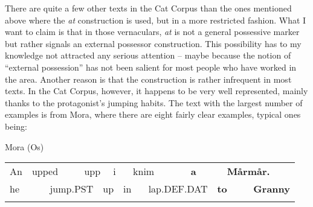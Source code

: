 \begin{styleBodytextC}
There are quite a few other texts in the Cat Corpus than the ones mentioned above where the \textit{at }construction is used, but in a more restricted fashion. What I want to claim is that in those vernaculars, \textit{at }is not a general possessive marker but rather signals an external possessor construction. This possibility has to my knowledge not attracted any serious attention – maybe because the notion of “external possession” has not been salient for most people who have worked in the area. Another reason is that the construction is rather infrequent in most texts. In the Cat Corpus, however, it happens to be very well represented, mainly thanks to the protagonist’s jumping habits. The text with the largest number of examples is from Mora, where there are eight fairly clear examples, typical ones being:

\end{styleBodytextC}


\begin{listWWNumileveli}
\item {}

\begin{styleExample}
\label{bkm:Ref137369958}Mora (Os)

\end{styleExample}

\end{listWWNumileveli}

\begin{listWWNumlxxxvileveli}
\item {}

\end{listWWNumlxxxvileveli}

\begin{tabular}{llllllllllllll}
\lsptoprule
An & \multicolumn{2}{l}{upped

} & \multicolumn{2}{l}{upp

} & \multicolumn{2}{l}{i

} & \multicolumn{2}{l}{knim

} & \multicolumn{2}{l}{{\bfseries a}

} & \multicolumn{2}{l}{{\bfseries Mårmår.}

} & \\
\multicolumn{2}{l}{he

} & \multicolumn{2}{l}{jump.PST

} & \multicolumn{2}{l}{up

} & \multicolumn{2}{l}{in

} & \multicolumn{2}{l}{lap.DEF.DAT

} & \multicolumn{2}{l}{{\bfseries to}

} & \multicolumn{2}{l}{{\bfseries Granny}

}\\
\lspbottomrule
\end{tabular}

